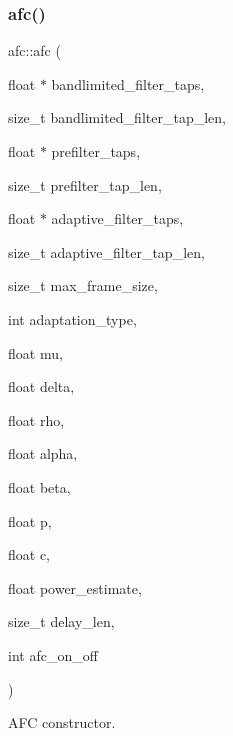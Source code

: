 \subsubsection{\texorpdfstring{afc()}{afc()}}
{\footnotesize\ttfamily afc\+::afc (\begin{DoxyParamCaption}\item[{float $\ast$}]{bandlimited\+\_\+filter\+\_\+taps,  }\item[{size\+\_\+t}]{bandlimited\+\_\+filter\+\_\+tap\+\_\+len,  }\item[{float $\ast$}]{prefilter\+\_\+taps,  }\item[{size\+\_\+t}]{prefilter\+\_\+tap\+\_\+len,  }\item[{float $\ast$}]{adaptive\+\_\+filter\+\_\+taps,  }\item[{size\+\_\+t}]{adaptive\+\_\+filter\+\_\+tap\+\_\+len,  }\item[{size\+\_\+t}]{max\+\_\+frame\+\_\+size,  }\item[{int}]{adaptation\+\_\+type,  }\item[{float}]{mu,  }\item[{float}]{delta,  }\item[{float}]{rho,  }\item[{float}]{alpha,  }\item[{float}]{beta,  }\item[{float}]{p,  }\item[{float}]{c,  }\item[{float}]{power\+\_\+estimate,  }\item[{size\+\_\+t}]{delay\+\_\+len,  }\item[{int}]{afc\+\_\+on\+\_\+off }\end{DoxyParamCaption})\hspace{0.3cm}{\ttfamily [explicit]}}



A\+FC constructor. 


